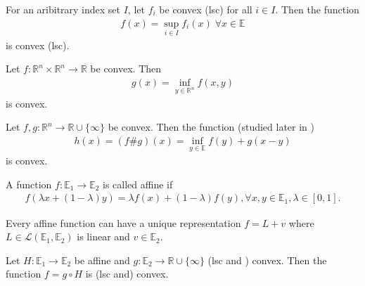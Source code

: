 \documentclass{tufte-handout}
\begin{document}
\begin{Proposition}
    For an aribitrary index set \( I\), let \( f_i \) be convex (lsc) for all \( i \in I \). 
    Then the function 
    \begin{align}
        f(x) = \sup_{i \in I} f_i(x)\; \forall x \in \mathbb{E}
    \end{align}
    is convex (lsc).
\end{Proposition}

\begin{Proposition}
    Let \( f: \mathbb{R}^n \times \mathbb{R}^n \to \mathbb{R}\) be convex. Then 
    \begin{align}
    g(x) = \inf_{y \in \mathbb{R}^n} f(x, y)
    \end{align}
    is convex.
\end{Proposition}

\begin{Proposition}
    Let \( f, g: \mathbb{R}^n\to \mathbb{R}\cup \{\infty\} \) be convex. Then the function (studied later in )
    \begin{align}
    h(x) = (f \# g)(x) = \inf_{y \in \mathbb{E}} f(y) + g(x - y)
    \end{align}
    is convex.
\end{Proposition}

\begin{Definition}
    A function \( f:\mathbb{E}_1 \to \mathbb{E}_2 \) is called affine if 
    \begin{align}
    f(\lambda x + (1-\lambda) y) = \lambda f(x) + (1-\lambda) f(y), \forall x, y \in \mathbb{E}_1, \lambda \in [0, 1].
    \end{align}
\end{Definition}
Every affine function can have a unique representation 
\(f = L + v\) where \( L \in \mathcal{L}(\mathbb{E}_1, \mathbb{E}_2)\)
is linear and \( v \in \mathbb{E}_2 \).

\begin{Proposition}
    Let \(H: \mathbb{E}_1 \to \mathbb{E}_2\) be affine and \(g: \mathbb{E}_2 \to \mathbb{R}\cup \{\infty\}\) 
(lsc and ) convex. Then the function \( f = g \circ H \) is (lsc and) convex.
\end{Proposition}
\end{document}
